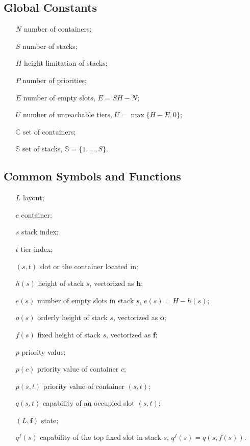 \documentclass{article}
\begin{document}
\subsection{Global Constants}
\begin{enumerate}[noitemsep, align=LabelCenter,labelwidth=\cpmpmylongest,leftmargin=!]
\item[$N$] number of containers;
\item[$S$] number of stacks;
\item[$H$] height limitation of stacks;
\item[$P$] number of priorities;
\item[$E$] number of empty slots, $E=SH-N$;
\item[$U$] number of unreachable tiers, $U=\max\{H-E,0\}$;
\item[$\mathbb{C}$] set of containers;
\item[$\mathbb{S}$] set of stacks, $\mathbb{S}=\{1,\dots,S\}$.
\end{enumerate}

\subsection{Common Symbols and Functions}
\begin{enumerate}[noitemsep, align=LabelCenter,labelwidth=\cpmpmylongest,leftmargin=!]
\item[$L$] layout;
\item[$c$] container;
\item[$s$] stack index;
\item[$t$] tier index;
\item[$(s, t)$] slot or the container located in;
\item[$h(s)$] height of stack $s$, vectorized as $\boldsymbol{h}$;
\item[$e(s)$] number of empty slots in stack $s$, $e(s)=H-h(s)$;
\item[$o(s)$] orderly height of stack $s$, vectorized as $\boldsymbol{o}$;
\item[$f(s)$] fixed height of stack $s$, vectorized as $\boldsymbol{f}$;
\item[$p$] priority value;
\item[$p(c)$] priority value of container $c$;
\item[$p(s,t)$] priority value of container $(s,t)$;
\item[$q(s,t)$] capability of an occupied slot $(s,t)$;
\item[$(L,\boldsymbol{f})$] state;
\item[$q^f(s)$] capability of the top fixed slot in stack $s$, $q^f(s)=q(s,f(s))$.
\end{enumerate}
\end{document}
